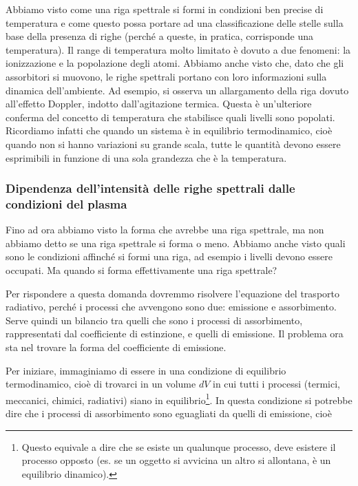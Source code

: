 



\vspace{0.2cm}Abbiamo visto come una riga spettrale si formi in condizioni ben precise di temperatura e come questo possa portare ad una classificazione delle stelle sulla base della presenza di righe (perché a queste, in pratica, corrisponde una temperatura). Il range di temperatura molto limitato è dovuto a due fenomeni: la ionizzazione e la popolazione degli atomi. Abbiamo anche visto che, dato che gli assorbitori si muovono, le righe spettrali portano con loro informazioni sulla dinamica dell'ambiente. Ad esempio, si osserva un allargamento della riga dovuto all'effetto Doppler, indotto dall'agitazione termica. Questa è un'ulteriore conferma del concetto di temperatura che stabilisce quali livelli sono popolati. Ricordiamo infatti che quando un sistema è in equilibrio termodinamico, cioè quando non si hanno variazioni su grande scala, tutte le quantità devono essere esprimibili in funzione di una sola grandezza che è la temperatura.

\subsubsection{Dipendenza dell'intensità delle righe spettrali dalle condizioni del plasma}
Fino ad ora abbiamo visto la forma che avrebbe una riga spettrale, ma non abbiamo detto se una riga spettrale si forma o meno. Abbiamo anche visto quali sono le condizioni affinché si formi una riga, ad esempio i livelli devono essere occupati. Ma quando si forma effettivamente una riga spettrale?

Per rispondere a questa domanda dovremmo risolvere l'equazione del trasporto radiativo, perché i processi che avvengono sono due: emissione e assorbimento. Serve quindi un bilancio tra quelli che sono i processi di assorbimento, rappresentati dal coefficiente di estinzione, e quelli di emissione. Il problema ora sta nel trovare la forma del coefficiente di emissione.

Per iniziare, immaginiamo di essere in una condizione di equilibrio termodinamico, cioè di trovarci in un volume $dV$ in cui tutti i processi (termici, meccanici, chimici, radiativi) siano in equilibrio\footnote{Questo equivale a dire che se esiste un qualunque processo, deve esistere il processo opposto (es. se un oggetto si avvicina un altro si allontana, è un equilibrio dinamico).}. In questa condizione si potrebbe dire che i processi di assorbimento sono eguagliati da quelli di emissione, cioè

